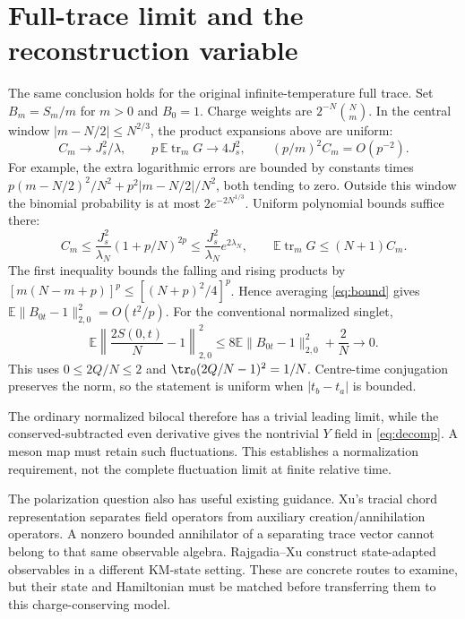 \documentclass[11pt,a4paper]{article}
\newcommand{\EE}{\mathbb E}
\newcommand{\trm}{\operatorname{tr}_m}
\begin{document}
\newpage
\section{Full-trace limit and the reconstruction variable}
The same conclusion holds for the original infinite-temperature full
trace. Set $B_m=S_m/m$ for $m>0$ and $B_0=1$. Charge weights are
$2^{-N}\binom Nm$. In the central window
$|m-N/2|\leq N^{2/3}$, the product expansions above are uniform:
\begin{equation}
 C_m\to J_s^2/\lambda,\qquad
 p\,\EE\trm G\to4J_s^2,\qquad (p/m)^2C_m=O(p^{-2}).
\end{equation}
For example, the extra logarithmic errors are bounded by constants
times $p(m-N/2)^2/N^2+p^2|m-N/2|/N^2$, both tending to zero.
Outside this window the binomial probability is at most
$2e^{-2N^{1/3}}$. Uniform polynomial bounds suffice there:
\begin{equation}
 C_m\leq\frac{J_s^2}{\lambda_N}(1+p/N)^{2p}
 \leq\frac{J_s^2}{\lambda_N}e^{2\lambda_N},\qquad
 \EE\trm G\leq(N+1)C_m.
\end{equation}
The first inequality bounds the falling and rising products by
$[m(N-m+p)]^p\leq[(N+p)^2/4]^p$.
Hence averaging \eqref{eq:bound} gives
$\EE\|B_{0t}-1\|_{2,0}^2=O(t^2/p)$.
For the conventional normalized singlet,
\begin{equation}
 \EE\left\|\frac{2S(0,t)}N-1\right\|_{2,0}^2
 \leq8\EE\|B_{0t}-1\|_{2,0}^2+\frac2N
 \longrightarrow0.
\end{equation}
This uses $0\leq2Q/N\leq2$ and
$\tr_0(2Q/N-1)^2=1/N$. Centre-time conjugation preserves the norm,
so the statement is uniform when $|t_b-t_a|$ is bounded.

The ordinary normalized bilocal therefore has a trivial leading
limit, while the conserved-subtracted even derivative gives the
nontrivial $Y$ field in \eqref{eq:decomp}. A meson map must retain
such fluctuations. This establishes a normalization requirement,
not the complete fluctuation limit at finite relative time.

The polarization question also has useful existing guidance.
Xu's tracial chord representation \cite{Xu} separates field operators
from auxiliary creation/annihilation operators. A nonzero bounded
annihilator of a separating trace vector cannot belong to that same
observable algebra. Rajgadia--Xu \cite{RX} construct state-adapted
observables in a different KM-state setting. These are concrete
routes to examine, but their state and Hamiltonian must be matched
before transferring them to this charge-conserving model.
\end{document}
